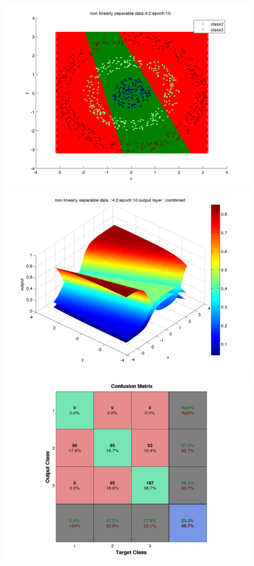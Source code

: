 \documentclass[fleqn]{article}
\begin{document}
\includegraphics[scale=0.3]{./pics/nonlinearlyseparable/_4_2/_4_2_epoch_10_decisionBoundary}
\includegraphics[scale=0.3]{./pics/nonlinearlyseparable/_4_2/_4_2_epoch_10_output layer :_combined}
\includegraphics[scale=0.3]{./pics/nonlinearlyseparable/_4_2/_4_2_epoch_10_confusion}
\end{document}
